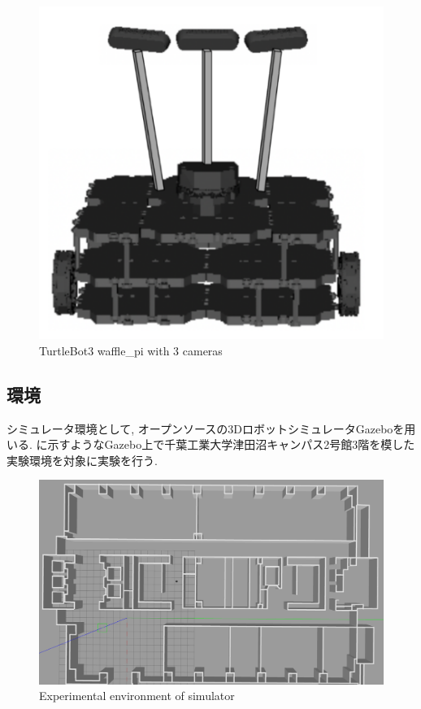     \begin{figure}[hbtp]
      \centering
    \includegraphics[keepaspectratio, scale=0.22]
          {images/Waffle_pi.png}
    \caption{TurtleBot3 waffle\_pi with 3 cameras}
    \label{Fig:waffle_pi}
    \end{figure}

    \subsection{環境}
    シミュレータ環境として, オープンソースの3DロボットシミュレータGazebo\cite{gazebo}を用いる. に示すようなGazebo上で千葉工業大学津田沼キャンパス2号館3階を模した実験環境を対象に実験を行う.

    \begin{figure}[hbtp]
      \centering
    \includegraphics[keepaspectratio, scale=0.12]
          {images/tsudanuma2-3_simorg.png}
    \caption{Experimental environment of simulator}
    \label{Fig:sim}
    \end{figure}

